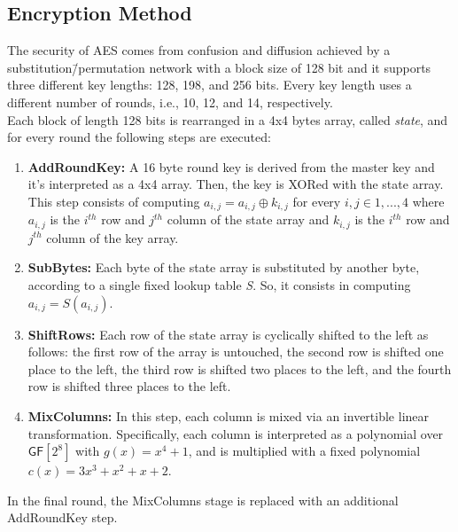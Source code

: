 \subsection{Encryption Method}
The security of AES comes from confusion and diffusion achieved by a substitution\=/permutation network with a block size of 128 bit and it supports three different key lengths: 128, 198, and 256 bits. Every key length uses a different number of rounds, i.e., 10, 12, and 14, respectively.\\
Each block of length 128 bits is rearranged in a 4x4 bytes array, called \emph{state}, and for every round the following steps are executed:
\begin{enumerate}
    \item{\textbf{AddRoundKey:} A 16 byte round key is derived from the master key and it's interpreted as a 4x4 array. Then, the key is XORed with the state array.\\This step consists of computing $a_{i,j} = a_{i,j} \oplus k_{i,j}$ for every $i,j \in {1,...,4}$ where $a_{i,j}$ is the $i^{th}$ row and $j^{th}$ column of the state array and $k_{i,j}$ is the $i^{th}$ row and $j^{th}$ column of the key array.}
    \item{\textbf{SubBytes:} Each byte of the state array is substituted by another byte, according to a single fixed lookup table \emph{S}. So, it consists in computing $a_{i,j} = S(a_{i,j})$.}
    \item{\textbf{ShiftRows:} Each row of the state array is cyclically shifted to the left as follows: the first row of the array is untouched, the second row is shifted one place to the left, the third row is shifted two places to the left, and the fourth row is shifted three places to the left.}
    \item{\textbf{MixColumns:} In this step, each column is mixed via an invertible linear transformation. Specifically, each column is interpreted as a polynomial over $\mathsf{GF}[2^8]$ with $g(x) = x^4 + 1$, and is multiplied with a fixed polynomial $c(x) = 3x^3 + x^2 + x + 2$.}
\end{enumerate}
In the final round, the MixColumns stage is replaced with an additional AddRoundKey step.
